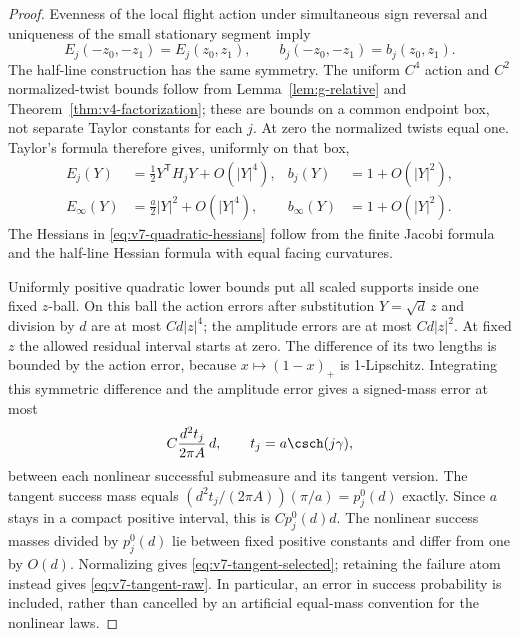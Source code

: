 \begin{proof}
Evenness of the local flight action under simultaneous sign reversal and uniqueness of the small stationary segment imply
\[
 E_j(-z_0,-z_1)=E_j(z_0,z_1),\qquad
 b_j(-z_0,-z_1)=b_j(z_0,z_1).
\]
The half-line construction has the same symmetry. The uniform $C^4$ action and $C^2$ normalized-twist bounds follow from Lemma~\ref{lem:g-relative} and Theorem~\ref{thm:v4-factorization}; these are bounds on a common endpoint box, not separate Taylor constants for each $j$. At zero the normalized twists equal one. Taylor's formula therefore gives, uniformly on that box,
\begin{align*}
 E_j(Y)&=\tfrac12Y^{\mathsf T}H_jY+O(|Y|^4),&
 b_j(Y)&=1+O(|Y|^2),\\
 E_\infty(Y)&=\tfrac a2|Y|^2+O(|Y|^4),&
 b_\infty(Y)&=1+O(|Y|^2).
\end{align*}
The Hessians in \eqref{eq:v7-quadratic-hessians} follow from the finite Jacobi formula and the half-line Hessian formula with equal facing curvatures.

Uniformly positive quadratic lower bounds put all scaled supports inside one fixed $z$-ball. On this ball the action errors after substitution $Y=\sqrt d\,z$ and division by $d$ are at most $Cd|z|^4$; the amplitude errors are at most $Cd|z|^2$. At fixed $z$ the allowed residual interval starts at zero. The difference of its two lengths is bounded by the action error, because $x\mapsto(1-x)_+$ is 1-Lipschitz. Integrating this symmetric difference and the amplitude error gives a signed-mass error at most
\[
 C\frac{d^2t_j}{2\pi A}\,d,
 \qquad t_j=a\csch(j\gamma),
\]
between each nonlinear successful submeasure and its tangent version. The tangent success mass equals $(d^2t_j/(2\pi A))(\pi/a)=p_j^0(d)$ exactly. Since $a$ stays in a compact positive interval, this is $Cp_j^0(d)d$. The nonlinear success masses divided by $p_j^0(d)$ lie between fixed positive constants and differ from one by $O(d)$. Normalizing gives \eqref{eq:v7-tangent-selected}; retaining the failure atom instead gives \eqref{eq:v7-tangent-raw}. In particular, an error in success probability is included, rather than cancelled by an artificial equal-mass convention for the nonlinear laws.
\end{proof}

